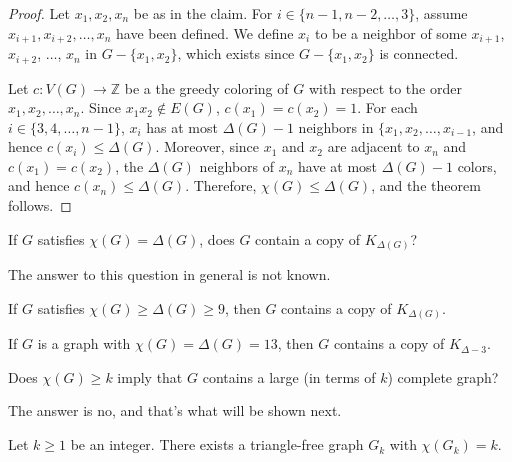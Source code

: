 \begin{proof}
    Let \(x_1, x_2, x_n\) be as in the claim.
    For \(i \in \{n-1, n-2, \ldots, 3\}\),
    assume \(x_{i+1}, x_{i+2}, \ldots, x_n\) have been defined.
    We define \(x_i\) to be a neighbor of some \(x_{i+1}\), \(x_{i+2}\), \(\ldots\), \(x_n\) in \(G - \{x_1, x_2\}\), which exists since \(G - \{x_1, x_2\}\) is connected.

    Let \(c \colon V(G) \to \mathbb{Z}\) be a the greedy coloring of \(G\) with respect to the order \(x_1, x_2, \ldots, x_n\).
    Since \(x_1x_2 \notin E(G)\), \(c(x_1) = c(x_2) = 1\).
    For each \(i \in \{3, 4, \ldots, n-1\}\),
    \(x_i\) has at most \(\Delta(G) - 1\) neighbors in \(\{x_1, x_2, \ldots, x_{i-1}\), and hence \(c(x_i) \leq \Delta(G)\).
    Moreover, since \(x_1\) and \(x_2\) are adjacent to \(x_n\) and \(c(x_1) = c(x_2)\), the \(\Delta(G)\) neighbors of \(x_n\) have at most \(\Delta(G) - 1\) colors, and hence \(c(x_n) \leq \Delta(G)\).
    Therefore, \(\chi(G) \leq \Delta(G)\), and the theorem follows.
\end{proof}

\begin{question}
    If \(G\) satisfies \(\chi(G) = \Delta(G)\),
    does \(G\) contain a copy of \(K_{\Delta(G)}\)?
\end{question}

The answer to this question in general is not known.

\begin{conjecture}
    If \(G\) satisfies \(\chi(G) \geq \Delta(G) \geq 9\),
    then \(G\) contains a copy of \(K_{\Delta(G)}\).
\end{conjecture}

\begin{theorem}
    If \(G\) is a graph with \(\chi(G) = \Delta(G) = 13\),
    then \(G\) contains a copy of \(K_{\Delta - 3}\).
\end{theorem}

\begin{question}
    Does \(\chi(G) \geq k\) imply that \(G\) contains a large (in terms of \(k\)) complete graph?
\end{question}

The answer is no, and that's what will be shown next.

\begin{theorem}
    Let \(k \geq 1\) be an integer.
    There exists a triangle-free graph \(G_k\) with \(\chi(G_k) = k\).
\end{theorem}

